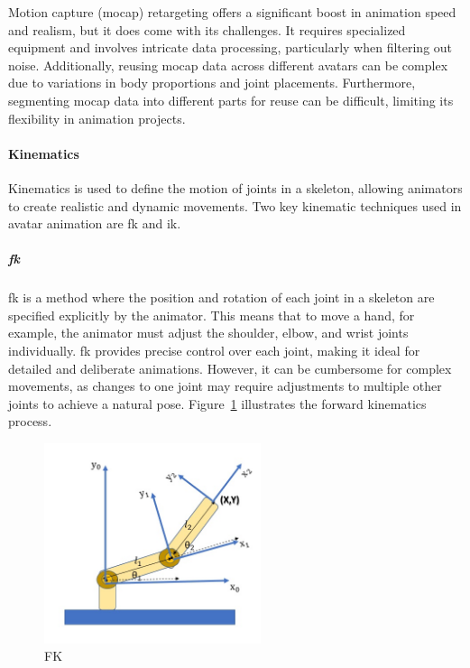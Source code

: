 \documentclass[../../main.tex]{subfiles}
\begin{document}
Motion capture (mocap) retargeting offers a significant boost in animation speed and realism, but it does come with its challenges. It requires specialized equipment and involves intricate data processing, particularly when filtering out noise. Additionally, reusing mocap data across different avatars can be complex due to variations in body proportions and joint placements. Furthermore, segmenting mocap data into different parts for reuse can be difficult, limiting its flexibility in animation projects.

\paragraph{Kinematics}
\label{ch:background_work:sign_language_synthesis:3d_techniques:avatar_animation:kinematics}

Kinematics is used to define the motion of joints in a skeleton, allowing animators to create realistic and dynamic movements. Two key kinematic techniques used in avatar animation are \gls{fk} and \gls{ik}.

\subparagraph{\gls{fk}}
\label{ch:background_work:sign_language_synthesis:3d_techniques:avatar_animation:kinematics:forward_kinematics}

\gls{fk} is a method where the position and rotation of each joint in a skeleton are specified explicitly by the animator. This means that to move a hand, for example, the animator must adjust the shoulder, elbow, and wrist joints individually. \gls{fk} provides precise control over each joint, making it ideal for detailed and deliberate animations. However, it can be cumbersome for complex movements, as changes to one joint may require adjustments to multiple other joints to achieve a natural pose. Figure~\ref{fig:forward_kinematics_example} illustrates the forward kinematics process.

\begin{figure} 
  \centering \includegraphics[width = 2.5in]{chapters/background_work/images/forward_kinematics_example.png} 
  \caption{FK} 
  \label{fig:forward_kinematics_example} 
\end{figure}
\end{document}
